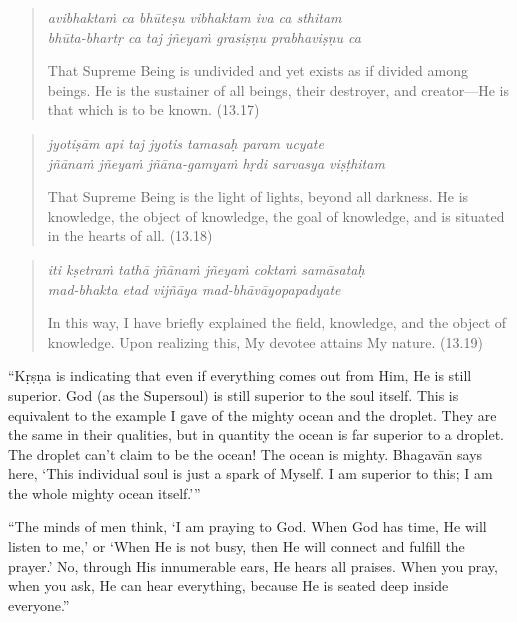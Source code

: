 \documentclass[12pt, twoside, openright]{memoir}
\begin{document}
\par
\begin{verse}
\textit{avibhaktaṁ ca bhūteṣu vibhaktam iva ca sthitam} \\
\textit{bhūta-bhartṛ ca taj jñeyaṁ grasiṣṇu prabhaviṣṇu ca}

\noindent That Supreme Being is undivided and yet exists as if divided among beings. He is the sustainer of all beings, their destroyer, and creator---He is that which is to be known. (13.17)
\end{verse}
\par



\par
\begin{verse}
\textit{jyotiṣām api taj jyotis tamasaḥ param ucyate} \\
\textit{jñānaṁ jñeyaṁ jñāna-gamyaṁ hṛdi sarvasya viṣṭhitam}

\noindent That Supreme Being is the light of lights, beyond all darkness. He is knowledge, the object of knowledge, the goal of knowledge, and is situated in the hearts of all. (13.18)
\end{verse}
\par



\par
\begin{verse}
\textit{iti kṣetraṁ tathā jñānaṁ jñeyaṁ coktaṁ samāsataḥ} \\
\textit{mad-bhakta etad vijñāya mad-bhāvāyopapadyate}

\noindent In this way, I have briefly explained the field, knowledge, and the object of knowledge. Upon realizing this, My devotee attains My nature. (13.19)
\end{verse}
\par


\enquote{Kṛṣṇa is indicating that even if everything comes out from Him, He is still superior. God (as the Supersoul) is still superior to the soul itself. This is equivalent to the example I gave of the mighty ocean and the droplet. They are the same in their qualities, but in quantity the ocean is far superior to a droplet. The droplet can’t claim to be the ocean! The ocean is mighty. Bhagavān says here, \enquote{This individual soul is just a spark of Myself. I am superior to this; I am the whole mighty ocean itself.}}

\enquote{The minds of men think, \enquote{I am praying to God. When God has time, He will listen to me,} or \enquote{When He is not busy, then He will connect and fulfill the prayer.} No, through His innumerable ears, He hears all praises. When you pray, when you ask, He can hear everything, because He is seated deep inside everyone.}
\end{document}
